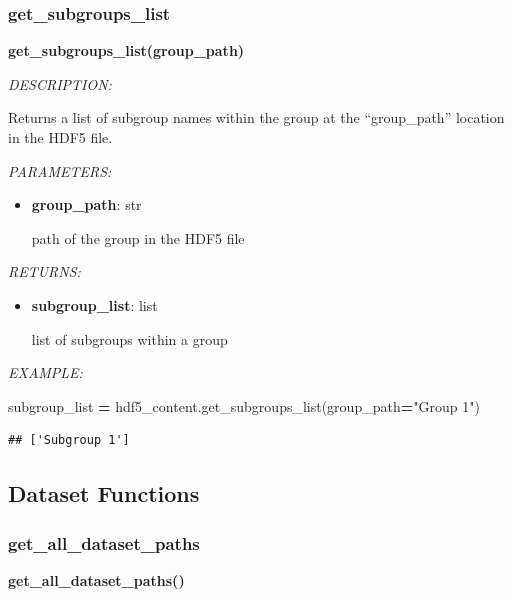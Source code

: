 \documentclass[
]{article}
\newenvironment{Shaded}{\begin{snugshade}}{\end{snugshade}}
\newcommand{\NormalTok}[1]{#1}
\newcommand{\OperatorTok}[1]{\textcolor[rgb]{0.81,0.36,0.00}{\textbf{#1}}}
\newcommand{\StringTok}[1]{\textcolor[rgb]{0.31,0.60,0.02}{#1}}
\begin{document}
\hypertarget{get_subgroups_list}{%
\subsubsection{get\_subgroups\_list}\label{get_subgroups_list}}

\textbf{get\_subgroups\_list(group\_path)}

\emph{DESCRIPTION:}

Returns a list of subgroup names within the group at the ``group\_path'' location in the HDF5 file.

\emph{PARAMETERS:}

\begin{itemize}
\item
  \textbf{group\_path}: str

  path of the group in the HDF5 file
\end{itemize}

\emph{RETURNS:}

\begin{itemize}
\item
  \textbf{subgroup\_list}: list

  list of subgroups within a group
\end{itemize}

\emph{EXAMPLE:}

\begin{Shaded}
\begin{Highlighting}[]
\NormalTok{subgroup_list }\OperatorTok{=}\NormalTok{ hdf5_content.get_subgroups_list(group_path}\OperatorTok{=}\StringTok{"Group 1"}\NormalTok{)}
\end{Highlighting}
\end{Shaded}

\begin{verbatim}
## ['Subgroup 1']
\end{verbatim}

\hypertarget{dataset-functions}{%
\subsection{Dataset Functions}\label{dataset-functions}}

\hypertarget{get_all_dataset_paths}{%
\subsubsection{get\_all\_dataset\_paths}\label{get_all_dataset_paths}}

\textbf{get\_all\_dataset\_paths()}
\end{document}
